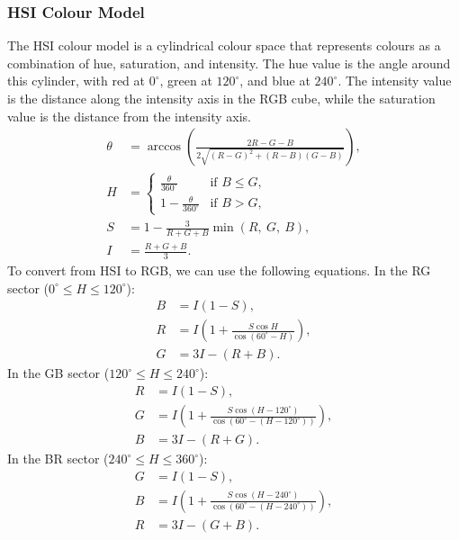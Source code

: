 \documentclass{article}
\begin{document}
\subsubsection{HSI Colour Model}
The HSI colour model is a cylindrical colour space that represents
colours as a combination of hue, saturation, and intensity. The hue
value is the angle around this cylinder, with red at \(0^{\circ}\),
green at \(120^{\circ}\), and blue at \(240^{\circ}\). The intensity
value is the distance along the intensity axis in the RGB cube, while
the saturation value is the distance from the intensity axis.
\begin{align}
    \theta & = \arccos\left( \frac{2R - G - B}{2\sqrt{\left( R - G \right)^2 + \left( R - B \right)\left( G - B \right)}} \right), \\
    H      & =
    \begin{cases}
        \frac{\theta}{360^{\circ}}     & \text{if } B \leqslant G, \\
        1 - \frac{\theta}{360^{\circ}} & \text{if } B > G,
    \end{cases}
    \\
    S      & = 1 - \frac{3}{R + G + B} \min\left( R,\: G,\: B \right),                                                             \\
    I      & = \frac{R + G + B}{3}.
\end{align}
To convert from HSI to RGB, we can use the following equations. In the
RG sector (\(0^{\circ} \leqslant H \leqslant 120^{\circ}\)):
\begin{align*}
    B & = I\left( 1 - S \right),                                                 \\
    R & = I\left( 1 + \frac{S\cos H}{\cos\left( 60^{\circ} - H \right)} \right), \\
    G & = 3I - \left( R + B \right).
\end{align*}
In the GB sector (\(120^{\circ} \leqslant H \leqslant 240^{\circ}\)):
\begin{align*}
    R & = I\left( 1 - S \right),                                                                                                          \\
    G & = I\left( 1 + \frac{S\cos\left( H - 120^{\circ} \right)}{\cos\left( 60^{\circ} - \left( H - 120^{\circ} \right) \right)} \right), \\
    B & = 3I - \left( R + G \right).
\end{align*}
In the BR sector (\(240^{\circ} \leqslant H \leqslant 360^{\circ}\)):
\begin{align*}
    G & = I\left( 1 - S \right),                                                                                                          \\
    B & = I\left( 1 + \frac{S\cos\left( H - 240^{\circ} \right)}{\cos\left( 60^{\circ} - \left( H - 240^{\circ} \right) \right)} \right), \\
    R & = 3I - \left( G + B \right).
\end{align*}
\end{document}
